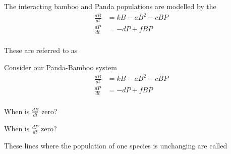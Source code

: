 \begin{applicationActivities}
\begin{observation}
The interacting bamboo and Panda populations are modelled by the 
\begin{alignat*}{2}
\frac{dB}{dt} &= kB-aB^2-cBP\\
\frac{dP}{dt} &= -dP+fBP \\
\end{alignat*}

\vfill
These are referred to as 
\end{observation}

\begin{activity}{10}
Consider our Panda-Bamboo system
\begin{alignat*}{2}
\frac{dB}{dt} &= kB-aB^2-cBP\\
\frac{dP}{dt} &= -dP+fBP \\
\end{alignat*}
\begin{subactivity}
When is \(\frac{dB}{dt}\) zero?
\end{subactivity}
\begin{subactivity}
When is \(\frac{dP}{dt}\) zero?
\end{subactivity}
\end{activity}

\begin{observation}
These lines where the population of one species is unchanging are called 

\begin{center}
\end{center}

\end{observation}


\end{applicationActivities}
